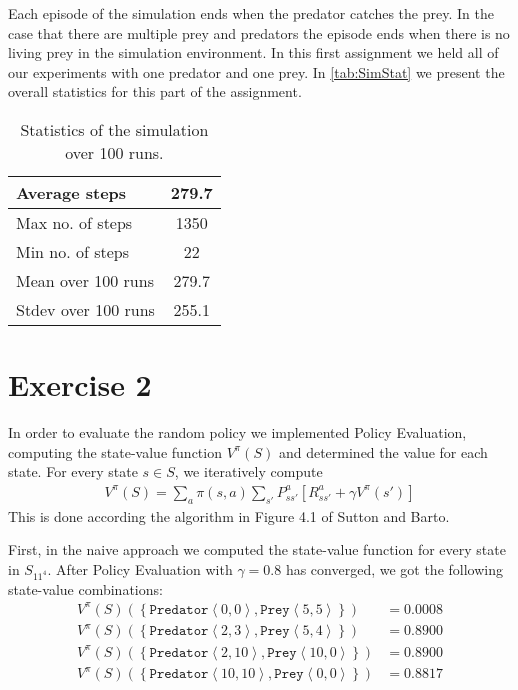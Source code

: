 \documentclass[a4paper,11pt]{article}
\newcommand{\Pred}[2]{\ensuremath{\mathtt{Predator}\left<#1, #2\right>}}
\newcommand{\Prey}[2]{\ensuremath{\mathtt{Prey}\left<#1, #2\right>}}
\newcommand{\SN}[0]{\ensuremath{S_{11^4}}}
\begin{document}
Each episode of the simulation ends when the predator catches the prey.  In the case that there are multiple prey and predators the episode ends when there is no living prey in the simulation environment.  In this first assignment we held all of our experiments with one predator and one prey.  In \autoref{tab:SimStat} we present the overall statistics for this part of the assignment.

\begin{table}[h!]
\caption{Statistics of the simulation over 100 runs.}
\label{tab:SimStat}
\begin{center}
\begin{small}
\begin{tabular}{|@{ }l@{ }|@{ }c@{ }|}
    \hline
      Average steps & 279.7 \\ \hline
      Max no. of steps & 1350   \\ \hline
      Min no. of steps & 22 \\ \hline
      Mean over 100 runs & 279.7  \\ \hline
      Stdev over 100 runs & 255.1 \\
    \hline
    \end{tabular}      
\end{small}
\end{center}  
\end{table}

\section*{Exercise 2}
In order to evaluate the random policy we implemented Policy Evaluation, computing the state-value function $V^\pi(S)$ and determined the value for each state.  For every state $s \in S$, we iteratively compute
\begin{align*}
V^\pi{(S)} = \sum_{a}\pi(s,a)\sum_{s'}P_{ss'}^a[R_{ss'}^a + \gamma V^{\pi}(s')]
\end{align*}
This is done according the algorithm in Figure 4.1 of Sutton and Barto.

First, in the naive approach we computed the state-value function for every state in $\SN$.  After Policy Evaluation with $\gamma = 0.8$ has converged, we got the following state-value combinations:
\begin{align*}
  V^\pi(S)(\left\{\Pred{0}{0},\Prey{5}{5}\right\})   & = 0.0008 \\
    V^\pi(S)(\left\{\Pred{2}{3},\Prey{5}{4}\right\})   &= 0.8900 \\
    V^\pi(S)(\left\{\Pred{2}{10},\Prey{10}{0}\right\}) &= 0.8900 \\
    V^\pi(S)(\left\{\Pred{10}{10},\Prey{0}{0}\right\}) &= 0.8817
\end{align*}
\end{document}
